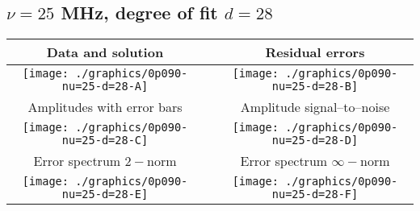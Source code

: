 

% 

\clearpage{}
\break{}

\subsection{$\nu = 25$ MHz, degree of fit $d = 28$}

\begin{table}[h]
    \begin{center}
        \begin{tabular}{ccc}
            Data and solution & \quad & Residual errors \\\hline
            \texttt{[image: ./graphics/0p090-nu=25-d=28-A]} &&
            \texttt{[image: ./graphics/0p090-nu=25-d=28-B]} \\[15pt]
            Amplitudes with error bars && Amplitude signal--to--noise \\\hline
            \texttt{[image: ./graphics/0p090-nu=25-d=28-C]} &&
            \texttt{[image: ./graphics/0p090-nu=25-d=28-D]} \\[15pt]
            Error spectrum $2-$norm && Error spectrum $\infty-$norm \\\hline
            \texttt{[image: ./graphics/0p090-nu=25-d=28-E]} &&
            \texttt{[image: ./graphics/0p090-nu=25-d=28-F]} \\[15pt]
        \end{tabular}
    \end{center}
\label{fig:elev=90, nu=25}
\end{table}



\endinput
